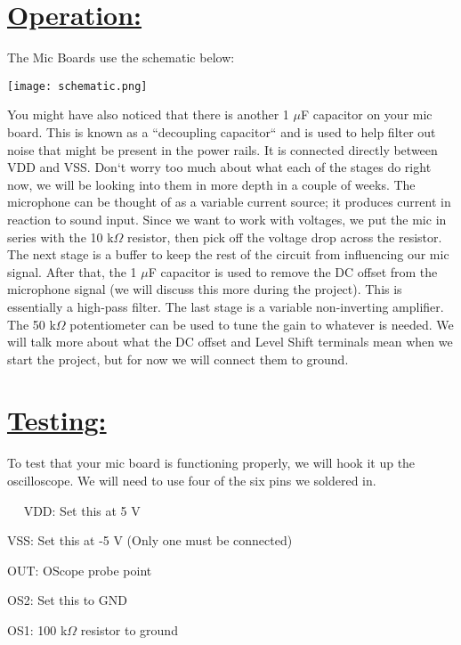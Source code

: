 \documentclass{tufte-handout}
\begin{document}
\section{\underline{\textbf{Operation:}}}\label{sec:page-layout}
\noindent The Mic Boards use the schematic below:

\begin{figure*}[h!]
  \texttt{[image: schematic.png]}%
  \label{fig:fullfig}%
\end{figure*}

\medskip
\noindent \newline You might have also noticed that there is another 1 $\mu$F capacitor on your mic board. This is known as a ``decoupling capacitor`` and is used to help filter out noise that might be present in the power rails. It is connected directly between VDD and VSS.
\medskip
\noindent \newline Don`t worry too much about what each of the stages do right now, we will be looking into them in more depth in a couple of weeks.
\medskip
\noindent \newline The microphone can be thought of as a variable current source; it produces current in reaction to sound input. Since we want to work with voltages, we put the mic in series with the 10 k$\Omega$ resistor, then pick off the voltage drop across the resistor.
\medskip
\noindent \newline The next stage is a buffer to keep the rest of the circuit from influencing our mic signal. After that, the 1 $\mu$F capacitor is used to remove the DC offset from the microphone signal (we will discuss this more during the project). This is essentially a high-pass filter.
\medskip
\noindent \newline The last stage is a variable non-inverting amplifier. The 50 k$\Omega$ potentiometer can be used to tune the gain to whatever is needed. We will talk more about what the DC offset and Level Shift terminals mean when we start the project, but for now we will connect them to ground.
\newpage

\section{\underline{\textbf{Testing:}}}\label{sec:page-layout}

\noindent To test that your mic board is functioning properly, we will hook it up the oscilloscope. We will need to use four of the six pins we soldered in.

\linebreak\
\linebreak\
\noindent
VDD: Set this at 5 V
\par\noindent
VSS: Set this at -5 V (Only one must be connected)
\par\noindent
OUT: OScope probe point
\par\noindent
OS2: Set this to GND
\par\noindent
OS1: 100 k$\Omega$ resistor to ground
\end{document}
